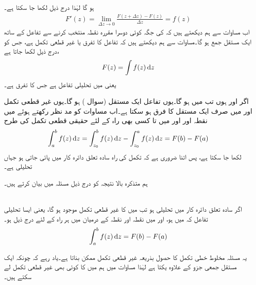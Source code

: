ہو گا لہٰذا درج ذیل لکھا جا سکتا ہے۔
\begin{align}\label{مساوات_مخلوط_تکمل_بذریعہ_غیر_قطعی_تکمل_ب}
F'(z)=\lim_{\Delta z\to 0} \frac{F(z+\Delta z)-F(z)}{\Delta z}=f(z)
\end{align}
اب مساوات  سے ہم دیکھتے ہیں کہ  کی جگہ کوئی دوسرا مقررہ نقطہ منتخب کرنے سے  تفاعل  کے ساتھ ایک مستقل جمع ہو گا۔مساوات  سے ہم دیکھتے ہیں کہ  تفاعل  کا تفرق یا غیر قطعی تکمل ہے، جس کو درج ذیل لکھا جاتا ہے،
\begin{align*}
F(z)=\int f(z)\dif z
\end{align*}
یعنی   میں  تحلیلی تفاعل ہے جس کا تفرق  ہے۔

اگر  اور  ہوں تب  میں  ہو گا۔یوں تفاعل  ایک مستقل (سوال ) ہو گا۔یوں غیر قطعی تکمل  اور  میں صرف ایک مستقل کا فرق ہو سکتا ہے۔اب مساوات  کو مد نظر رکھتے ہوئے  میں نقطہ  اور  اور    میں  تا   کسی بھی راہ کے لئے حقیقی قطعی تکمل کی طرح
\begin{align*}
\int_a^b f(z)\dif z=\int_{z_0}^b f(z)\dif z-\int_{z_0}^a f(z)\dif z=F(b)-F(a)
\end{align*}
لکھا جا سکتا ہے، پس اتنا ضروری ہے کہ تکمل کی راہ سادہ تعلق دائرہ کار  میں پائی جاتی ہو جہاں  تحلیلی ہے۔ 

ہم متذکرہ بالا نتیجہ کو درج ذیل مسئلہ میں بیان کرتے ہیں۔

\quad {}\\
اگر سادہ تعلق دائرہ کار  میں  تحلیلی ہو تب  میں  کا غیر قطعی تکمل موجود ہو گا، یعنی ایسا تحلیلی تفاعل  کہ  میں  ہو، اور  میں نقطہ  اور نقطہ  کے درمیان  میں ہر راہ کے لئے درج ذیل ہو۔
\begin{align}\label{مساوات_مخلوط_تکمل_بذریعہ_غیر_قطعی_تکمل}
\int_a^b f(z)\dif z=F(b)-F(a)
\end{align}

یہ مسئلہ مخلوط خطی تکمل کا حصول بذریعہ غیر قطعی تکمل ممکن بناتا ہے۔یاد رہے کہ چونکہ  ایک مستقل جمعی جزو کے علاوہ یکتا ہے لہٰذا مساوات  میں ہم  میں   کا کوئی بھی غیر قطعی تکمل   لے سکتے ہیں۔

